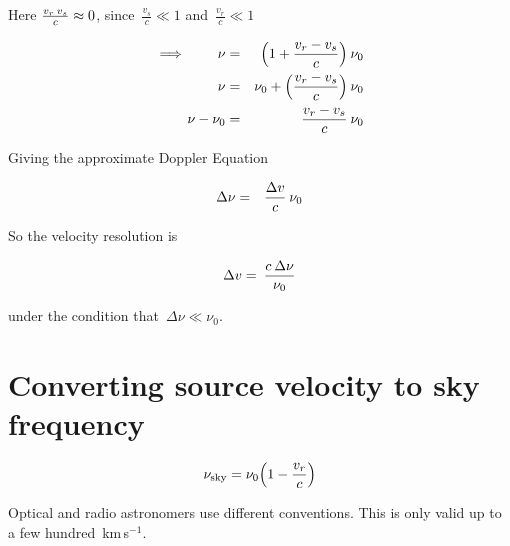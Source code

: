 \documentclass[11pt, a4paper]{article}
\newcommand{\msp}{\mkern \medmuskip}
\begin{document}
Here $\frac{v _r\msp v _s}{c} \approx 0$, since~$\frac{v _s}{c} \ll 1$ and~$\frac{v _r}{c} \ll 1$

\begin{eqnarray}
  \label{eq:37}
  \implies \qquad\nu &=& \Big (1 + \frac{v _r - v _s}{c} \Big ) \msp\nu_0 \nonumber \\
 \nu &=&\nu_0 + \Big (\frac{v _r - v _s}{c} \Big ) \msp\nu_0 \nonumber \\
 \nu -\nu_0 &=& \frac{v _r - v _s}{c} \msp\nu_0 \nonumber
\end{eqnarray}

Giving the approximate Doppler Equation

\begin{eqnarray}
  \label{eq:38}
  \Delta \nu &=& \frac{\Delta v}{c} \msp \nu_0
\end{eqnarray}

So the velocity resolution is

\begin{eqnarray}
  \label{eq:41}
  \Delta v = \msp \frac{c \msp \Delta \nu }{\nu_0}
\end{eqnarray}

under the condition that~$\Delta \nu \ll \nu _0$.

\section{Converting source velocity to sky frequency}

\begin{eqnarray}
  \label{eq:40}
  \nu _{\mbox{\scriptsize sky}} = \nu _0 \Big (1 - \frac{v_r}{c} \Big )
\end{eqnarray}

Optical and radio astronomers use different conventions. This is only valid up to a few hundred~km\,s$^{-1}$.
\end{document}
